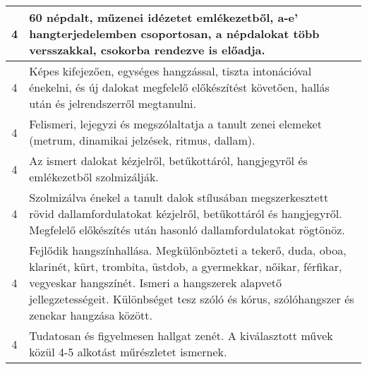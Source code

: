 \begin{longtable}{c | p{12cm} }
                                
                                          4 &  60 népdalt, műzenei idézetet emlékezetből, a-e’ hangterjedelemben csoportosan, a népdalokat több versszakkal, csokorba rendezve is előadja. \\ \hline
                                          4 &  Képes kifejezően, egységes hangzással, tiszta intonációval énekelni, és új dalokat megfelelő előkészítést követően, hallás után és jelrendszerről megtanulni. \\ \hline
                                          4 &  Felismeri, lejegyzi és megszólaltatja a tanult zenei elemeket (metrum, dinamikai jelzések, ritmus, dallam). \\ \hline
                                          4 &  Az ismert dalokat kézjelről, betűkottáról, hangjegyről és emlékezetből szolmizálják. \\ \hline
                                          4 &  Szolmizálva énekel a tanult dalok stílusában megszerkesztett rövid dallamfordulatokat kézjelről, betűkottáról és hangjegyről. Megfelelő előkészítés után hasonló dallamfordulatokat rögtönöz. \\ \hline
                                          4 &  Fejlődik hangszínhallása. Megkülönbözteti a tekerő, duda, oboa, klarinét, kürt, trombita, üstdob, a gyermekkar, nőikar, férfikar, vegyeskar hangszínét. Ismeri a hangszerek alapvető jellegzetességeit. Különbséget tesz szóló és kórus, szólóhangszer és zenekar hangzása között. \\ \hline
                                          4 &  Tudatosan és figyelmesen hallgat zenét. A kiválasztott művek közül 4-5 alkotást műrészletet ismernek. \\ \hline
                                      
                        \end{longtable}
            \clearpage


